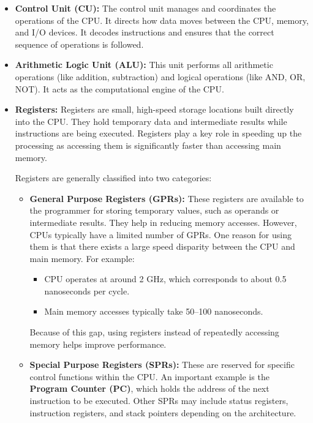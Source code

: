 \documentclass[12pt]{book}
\begin{document}
\begin{itemize}
    \item \textbf{Control Unit (CU):} The control unit manages and coordinates the operations of the CPU. It directs how data moves between the CPU, memory, and I/O devices. It decodes instructions and ensures that the correct sequence of operations is followed.

    \item \textbf{Arithmetic Logic Unit (ALU):} This unit performs all arithmetic operations (like addition, subtraction) and logical operations (like AND, OR, NOT). It acts as the computational engine of the CPU.

    \item \textbf{Registers:} Registers are small, high-speed storage locations built directly into the CPU. They hold temporary data and intermediate results while instructions are being executed. Registers play a key role in speeding up the processing as accessing them is significantly faster than accessing main memory.
    
    Registers are generally classified into two categories:
    \begin{itemize}
        \item \textbf{General Purpose Registers (GPRs):} These registers are available to the programmer for storing temporary values, such as operands or intermediate results. They help in reducing memory accesses. However, CPUs typically have a limited number of GPRs. One reason for using them is that there exists a large speed disparity between the CPU and main memory. For example:
        \begin{itemize}
            \item CPU operates at around 2 GHz, which corresponds to about 0.5 nanoseconds per cycle.
            \item Main memory accesses typically take 50--100 nanoseconds.
        \end{itemize}
        Because of this gap, using registers instead of repeatedly accessing memory helps improve performance.

        \item \textbf{Special Purpose Registers (SPRs):} These are reserved for specific control functions within the CPU. An important example is the \textbf{Program Counter (PC)}, which holds the address of the next instruction to be executed. Other SPRs may include status registers, instruction registers, and stack pointers depending on the architecture.
    \end{itemize}
\end{itemize}
\end{document}
